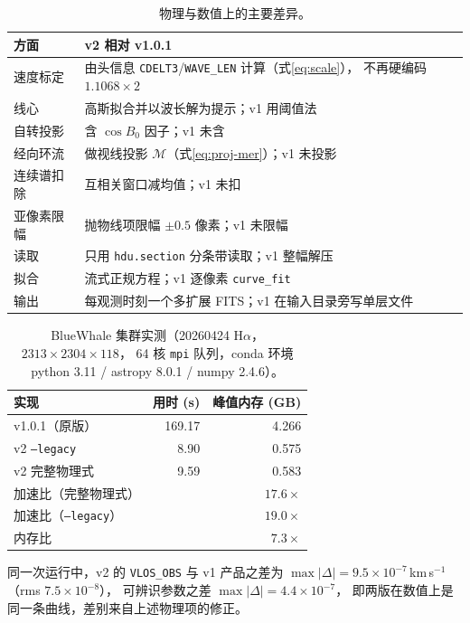 \documentclass[11pt,a4paper]{ctexart}
\newcommand{\code}[1]{\texttt{\small #1}}
\newcommand{\Merid}{\mathcal{M}}
\begin{document}
\begin{table}[htbp]
\centering
\small
\caption{物理与数值上的主要差异。}
\begin{tabular}{@{}p{}p{}@{}}
\toprule
方面 & v2 相对 v1.0.1 \\
\midrule
速度标定 & 由头信息 \code{CDELT3}/\code{WAVE\_LEN} 计算（式\eqref{eq:scale}），
          不再硬编码 $1.1068\times2$ \\
线心 & 高斯拟合并以波长解为提示；v1 用阈值法 \\
自转投影 & 含 $\cos B_0$ 因子；v1 未含 \\
经向环流 & 做视线投影 $\Merid$（式\eqref{eq:proj-mer}）；v1 未投影 \\
连续谱扣除 & 互相关窗口减均值；v1 未扣 \\
亚像素限幅 & 抛物线项限幅 $\pm0.5$ 像素；v1 未限幅 \\
读取 & 只用 \code{hdu.section} 分条带读取；v1 整幅解压 \\
拟合 & 流式正规方程；v1 逐像素 \code{curve\_fit} \\
输出 & 每观测时刻一个多扩展 FITS；v1 在输入目录旁写单层文件 \\
\bottomrule
\end{tabular}
\end{table}

\begin{table}[htbp]
\centering
\small
\caption{BlueWhale 集群实测（20260424 H$\alpha$，$2313\times2304\times118$，
64 核 \code{mpi} 队列，conda 环境 python 3.11 / astropy 8.0.1 / numpy 2.4.6）。}
\label{tab:speed}
\begin{tabular}{@{}lrr@{}}
\toprule
实现 & 用时 (s) & 峰值内存 (GB) \\
\midrule
v1.0.1（原版）            & 169.17 & 4.266 \\
v2 \code{--legacy}        &   8.90 & 0.575 \\
v2 完整物理式             &   9.59 & 0.583 \\
\midrule
加速比（完整物理式）      & \multicolumn{2}{r}{$17.6\times$} \\
加速比（\code{--legacy}） & \multicolumn{2}{r}{$19.0\times$} \\
内存比                    & \multicolumn{2}{r}{$7.3\times$} \\
\bottomrule
\end{tabular}
\end{table}

\noindent
同一次运行中，v2 的 \code{VLOS\_OBS} 与 v1 产品之差为
$\max|\Delta| = 9.5\times10^{-7}$\,km\,s$^{-1}$（rms $7.5\times10^{-8}$），
可辨识参数之差 $\max|\Delta|=4.4\times10^{-7}$，
即两版在数值上是同一条曲线，差别来自上述物理项的修正。
\end{document}
